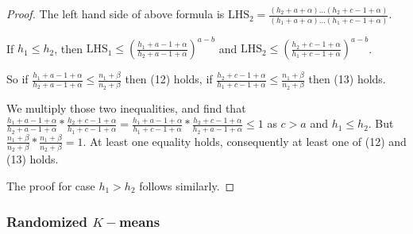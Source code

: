\documentclass[aoas,preprint]{imsart}
\begin{document}
\begin{proof}
 The left hand side of above formula is $\text{LHS}_2 = \frac{(h_2 + a + \alpha)...(h_2 + c - 1 + \alpha)}{(h_1 + a + \alpha) ... (h_1 + c - 1 + \alpha)}$.

If $h_1 \leq h_2$, then $\text{LHS}_1 \leq (\frac{h_1 + a - 1 + \alpha}{h_2 + a  - 1 + \alpha})^{a - b}$ and $\text{LHS}_2 \leq (\frac{h_2 + c - 1 + \alpha}{h_1 + c  - 1 + \alpha})^{a - b}$.

So if $\frac{h_1 + a - 1 + \alpha}{h_2 + a  - 1 + \alpha} \leq \frac{n_1 + \beta}{n_2 + \beta} $ then (12) holds, if $\frac{h_2 + c - 1 + \alpha}{h_1 + c  - 1 + \alpha} \leq \frac{n_1 + \beta}{n_2 + \beta}$ then (13) holds.

We multiply those two inequalities, and find that $\frac{h_1 + a - 1 + \alpha}{h_2 + a  - 1 + \alpha} * \frac{h_2 + c - 1 + \alpha}{h_1 + c  - 1 + \alpha} = \frac{h_1 + a - 1 + \alpha}{h_1 + c  - 1 + \alpha} * \frac{h_2 + c - 1 + \alpha}{h_2 + a  - 1 + \alpha} \leq 1$ as $c > a$ and $h_1 \leq h_2$. But $\frac{n_1 + \beta}{n_2 + \beta} * \frac{n_1 + \beta}{n_2 + \beta} = 1$. At least one equality holds, consequently at least one of (12) and (13) holds.

The proof for case $h_1 > h_2$ follows similarly.




\end{proof}




\subsubsection*{Randomized $K-$means}
\end{document}
